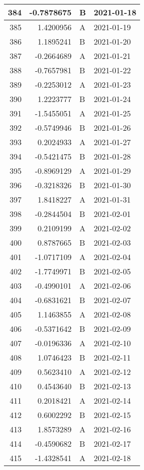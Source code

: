 \begin{tabular}{r|r|l|l}
\hline
384 & -0.7878675 & B & 2021-01-18\\
\hline
385 & 1.4200956 & A & 2021-01-19\\
\hline
386 & 1.1895241 & B & 2021-01-20\\
\hline
387 & -0.2664689 & A & 2021-01-21\\
\hline
388 & -0.7657981 & B & 2021-01-22\\
\hline
389 & -0.2253012 & A & 2021-01-23\\
\hline
390 & 1.2223777 & B & 2021-01-24\\
\hline
391 & -1.5455051 & A & 2021-01-25\\
\hline
392 & -0.5749946 & B & 2021-01-26\\
\hline
393 & 0.2024933 & A & 2021-01-27\\
\hline
394 & -0.5421475 & B & 2021-01-28\\
\hline
395 & -0.8969129 & A & 2021-01-29\\
\hline
396 & -0.3218326 & B & 2021-01-30\\
\hline
397 & 1.8418227 & A & 2021-01-31\\
\hline
398 & -0.2844504 & B & 2021-02-01\\
\hline
399 & 0.2109199 & A & 2021-02-02\\
\hline
400 & 0.8787665 & B & 2021-02-03\\
\hline
401 & -1.0717109 & A & 2021-02-04\\
\hline
402 & -1.7749971 & B & 2021-02-05\\
\hline
403 & -0.4990101 & A & 2021-02-06\\
\hline
404 & -0.6831621 & B & 2021-02-07\\
\hline
405 & 1.1463855 & A & 2021-02-08\\
\hline
406 & -0.5371642 & B & 2021-02-09\\
\hline
407 & -0.0196336 & A & 2021-02-10\\
\hline
408 & 1.0746423 & B & 2021-02-11\\
\hline
409 & 0.5623410 & A & 2021-02-12\\
\hline
410 & 0.4543640 & B & 2021-02-13\\
\hline
411 & 0.2018421 & A & 2021-02-14\\
\hline
412 & 0.6002292 & B & 2021-02-15\\
\hline
413 & 1.8573289 & A & 2021-02-16\\
\hline
414 & -0.4590682 & B & 2021-02-17\\
\hline
415 & -1.4328541 & A & 2021-02-18\\

\end{tabular}
